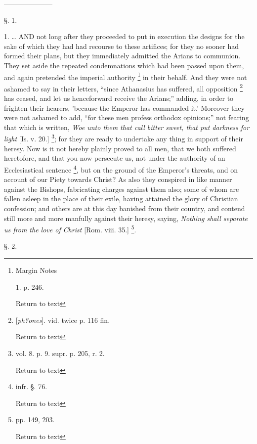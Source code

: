 ———————


§. 1.

1. … AND
not long after they proceeded to put in execution the designs for the
sake of which they had had recourse to these artifices; for they
no sooner had formed their plans, but they immediately admitted the
Arians to communion. They set aside the repeated condemnations which
had been passed upon them, and again pretended the imperial authority
\footnote{Margin Notes

1. p. 246.

Return to text} in their behalf. And
they were not ashamed to say in their letters, ``since Athanasius has
suffered, all opposition \footnote{[\emph{ph?ones}]. vid. twice p. 116 fin.

Return to text}
has ceased, and let us henceforward receive the Arians;'' adding, in
order to frighten their hearers, 'because the Emperor has commanded
it.' Moreover they were not ashamed to add, ``for these men profess
orthodox opinions;'' not fearing that which is written, \emph{Woe unto
them that call bitter sweet, that put darkness for light} [Is. v.
20.] \footnote{vol. 8. p. 9. supr. p. 205, r. 2.

Return to text}; for they are
ready to undertake any thing in support of their heresy. Now is it not
hereby plainly proved to all men, that we both suffered heretofore,
and that you now persecute us, not under the authority of an
Ecclesiastical sentence \footnote{infr. §. 76.

Return to text},
but on the ground of the Emperor's threats, and on account of our
Piety towards Christ? As also they conspired in like manner against
the Bishops, fabricating charges against them also; some of whom are
fallen asleep in the place of their exile, having attained the glory
of Christian confession; and others are at this day banished from
their country, and contend still more and more manfully against their
heresy, saying, \emph{Nothing shall separate us from the love of Christ}
[Rom. viii. 35.] \footnote{pp. 149, 203.

Return to text}.

§. 2.

